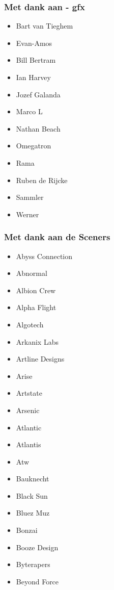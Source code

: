 
\begin{frame}[noframenumbering]
\frametitle{Met dank aan - gfx}

\begin{multicols}{2}
\begin{itemize}
\item Bart van Tieghem
\item Evan-Amos
\item Bill Bertram
\item Ian Harvey
\item Jozef Galanda
\item Marco L
\item Nathan Beach
\item Omegatron
\item Rama
\item Ruben de Rijcke
\item Sammler
\item Werner
\end{itemize}
\end{multicols}

\end{frame}


\begin{frame}[noframenumbering]
\frametitle{Met dank aan de Sceners}

\begin{multicols}{3}
\begin{itemize}
\item Abyss Connection
\item Abnormal
\item Albion Crew
\item Alpha Flight
\item Algotech
\item Arkanix Labs
\item Artline Designs
\item Arise
\item Artstate
\item Arsenic
\item Atlantic
\item Atlantis
\item Atw
\item Bauknecht
\item Black Sun
\item Bluez Muz
\item Bonzai
\item Booze Design
\item Byterapers
\item Beyond Force
\end{itemize}
\end{multicols}

\end{frame}

